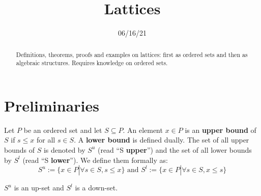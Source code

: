 

\title{\Large Lattices} \date{06/16/21}



\maketitle

\begin{abstract}

	Definitions, theorems, proofs and examples on lattices: first as ordered sets and then as algebraic structures. Requires knowledge on ordered sets.

\end{abstract}

\docrule


\section{Preliminaries}

\begin{definition} Let $P$ be an ordered set and let $S
\subseteq P$. An element $x \in P$ is an \textbf{upper bound} of $S$ if $s \leq
x$ for all $s \in S$. A \textbf{lower bound} is defined dually. The set of all
upper bounds of $S$ is denoted by $S^{u}$ (read ``S \textbf{upper}'') and the
set of all lower bounds by $S^{l}$ (read ``S \textbf{lower}''). We define them
formally as:
\begin{equation*} S^{u}:=\{x \in P | \forall s \in S, s \leq x\} \text{ and }
S^{l}:= \{x \in P | \forall s \in S, x \leq s\}
\end{equation*}
\end{definition}

\begin{prop} $S^{u}$ is an up-set and $S^{l}$ is a down-set.
\end{prop}

